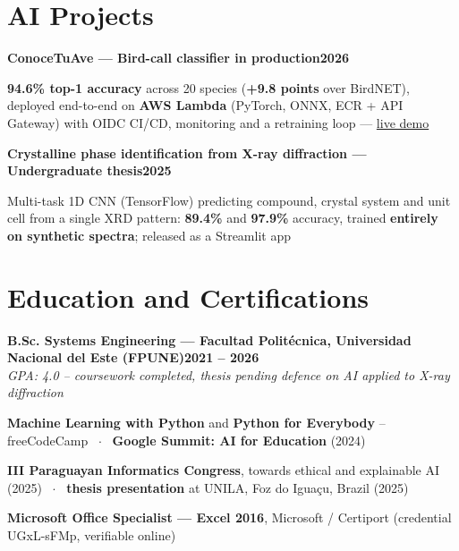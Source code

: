 \documentclass[letterpaper,10pt]{article}
\newcommand{\heading}[2]{
  \hspace{10pt}#1\hfill#2\\
}
\newcommand{\headingBf}[2]{
  \heading{\textbf{#1}}{\textbf{#2}}
}
\newcommand{\headingIt}[2]{
  \heading{\textit{#1}}{\textit{#2}}
}
\newenvironment{resume_list}{
  \vspace{-7pt}
  \begin{itemize}[itemsep=-2px, parsep=1pt, leftmargin=30pt]
}{
  \end{itemize}
}
\begin{document}
  \section{AI Projects}

  \headingBf{ConoceTuAve — Bird-call classifier in production}{2026}
  \begin{resume_list}
    \item \textbf{94.6\% top-1 accuracy} across 20 species (\textbf{+9.8 points} over BirdNET), deployed end-to-end on \textbf{AWS Lambda} (PyTorch, ONNX, ECR + API Gateway) with OIDC CI/CD, monitoring and a retraining loop — \href{https://huggingface.co/spaces/placaflaca/bird-classifier-py}{live demo}
  \end{resume_list}

  \headingBf{Crystalline phase identification from X-ray diffraction — Undergraduate thesis}{2025}
  \begin{resume_list}
    \item Multi-task 1D CNN (TensorFlow) predicting compound, crystal system and unit cell from a single XRD pattern: \textbf{89.4\%} and \textbf{97.9\%} accuracy, trained \textbf{entirely on synthetic spectra}; released as a Streamlit app
  \end{resume_list}


  \section{Education and Certifications}

  \headingBf{B.Sc. Systems Engineering — Facultad Politécnica, Universidad Nacional del Este (FPUNE)}{2021 -- 2026}
  \headingIt{GPA: 4.0 -- coursework completed, thesis pending defence on AI applied to X-ray diffraction}{}
  \begin{resume_list}
    \item \textbf{Machine Learning with Python} and \textbf{Python for Everybody} -- freeCodeCamp ~$\cdot$~ \textbf{Google Summit: AI for Education} (2024)
    \item \textbf{III Paraguayan Informatics Congress}, towards ethical and explainable AI (2025) ~$\cdot$~ \textbf{thesis presentation} at UNILA, Foz do Iguaçu, Brazil (2025)
    \item \textbf{Microsoft Office Specialist — Excel 2016}, Microsoft / Certiport (credential UGxL-sFMp, verifiable online)
  \end{resume_list}
\end{document}
